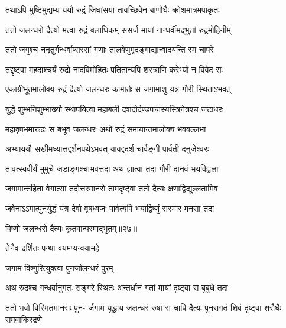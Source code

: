 \twolineshloka
{तथाऽपि मुष्टिमुद्यम्य ययौ रुद्रं जिघांसया}
{तावच्छिवेन बाणौघैः क्रोशमात्रमपाकृतः} %

\twolineshloka
{ततो जलन्धरो दैत्यो मत्वा रुद्रं बलाधिकम्}
{ससर्ज मायां गान्धर्वीमद्भुतां रुद्रमोहिनीम्} %

\twolineshloka
{ततो जगुश्च ननृतुर्गन्धर्वाप्सरसां गणाः}
{तालवेणुमृदङ्गाद्यान्वादयन्ति स्म चापरे} %

\twolineshloka
{तद्दृष्ट्वा महदाश्चर्यं रुद्रो नादविमोहितः}
{पतितान्यपि शस्त्राणि करेभ्यो न विवेद सः} %

\twolineshloka
{एकाग्रीभूतमालोक्य रुद्रं दैत्यो जलन्धरः}
{कामार्तः स जगामाशु यत्र गौरी स्थिताऽभवत्} %

\twolineshloka
{युद्धे शुम्भनिशुम्भाख्यौ स्थापयित्वा महाबली}
{दशदोर्दण्डपचास्यस्त्रिनेत्रश्च जटाधरः} %

\twolineshloka
{महावृषभमारूढः स बभूव जलन्धरः}
{अथो रुद्रं समायान्तमालोक्य भववल्लभा} %

\twolineshloka
{अभ्याययौ सखीमध्यात्तद्दर्शनपथेऽभवत्}
{यावद्ददर्श चार्वङ्गी पार्वती दनुजेश्वरः} %

\twolineshloka
{तावत्स्ववीर्यं मुमुचे जडाङ्गश्चाभवत्तदा}
{अथ ज्ञात्वा तदा गौरी दानवं भयविह्वला} %

\twolineshloka
{जगामान्तर्हिता वेगात्सा तदोत्तरमानसे}
{तामदृष्ट्वा ततो दैत्यः क्षणाद्विद्युल्लतामिव} %

\twolineshloka
{जवेनाऽऽगात्पुनर्युद्धं यत्र देवो वृषध्वजः}
{पार्वत्यपि भयाद्विष्णुं सस्मार मनसा तदा} %




विष्णो जलन्धरो दैत्यः कृतवान्परमाद्भुतम्॥२७॥



\onelineshloka
{तेनैव दर्शितः पन्था वयमप्यन्वयामहे} %




\onelineshloka
{जगाम विष्णुरित्युक्त्वा पुनर्जालन्धरं पुरम्} %

\twolineshloka
{अथ रुद्रश्च गन्धर्वानुगतः सङ्गरे स्थितः}
{अन्तर्धानं गतां मायां दृष्ट्वा स बुबुधे तदा} %

\fourlineindentedshloka
{ततो भवो विस्मितमानसः पुन-}
{र्जगाम युद्धाय जलन्धरं रुषा}
{स चापि दैत्यः पुनरागतं शिवं}
{दृष्ट्वा शरौघैः समवाकिरद्रणे} %


